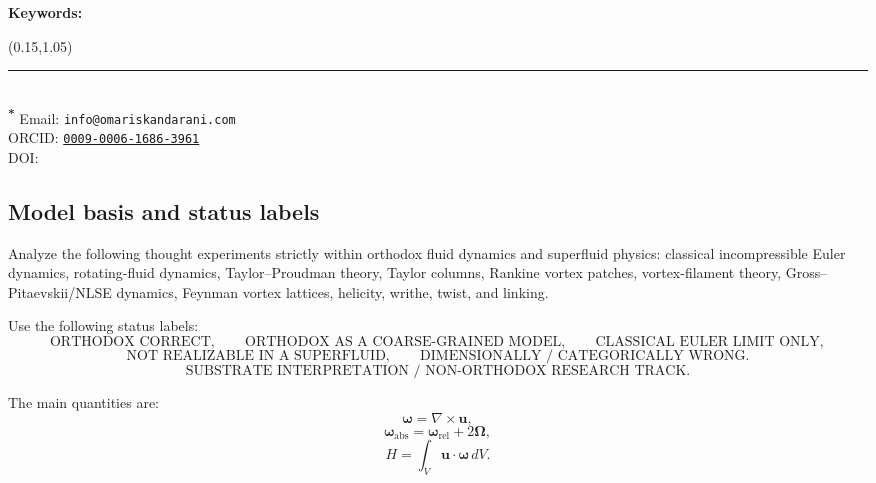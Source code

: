 \documentclass[11pt]{article}
\begin{document}
    \noindent\textbf{Keywords:} \paperkeywords


    \begin{textblock*}{1\textwidth}(0.15\textwidth,1.05\textheight)\raggedright\footnotesize\renewcommand{\arraystretch}{1.0} \noindent\rule{\textwidth}{0.4pt}\\[0.5em]
        \textsuperscript{\textbf{*}} Email: \texttt{info@omariskandarani.com}\\  
        ORCID: \texttt{\href{https://orcid.org/0009-0006-1686-3961}{0009-0006-1686-3961}}\\
        DOI: \href{https://doi.org/\paperdoi}{\paperdoi}    
    \end{textblock*}
    
    
    
    \newpage
    \tableofcontents
    \newpage

        \subsection{Model basis and status labels}
            
            Analyze the following thought experiments strictly within orthodox fluid dynamics and superfluid physics:
            classical incompressible Euler dynamics, rotating-fluid dynamics, Taylor--Proudman theory,
            Taylor columns, Rankine vortex patches, vortex-filament theory, Gross--Pitaevskii/NLSE dynamics,
            Feynman vortex lattices, helicity, writhe, twist, and linking.
            
            Use the following status labels:
            \[
                \text{ORTHODOX CORRECT},
                \qquad
                \text{ORTHODOX AS A COARSE-GRAINED MODEL},
                \qquad
                \text{CLASSICAL EULER LIMIT ONLY},
            \]
            \[
                \text{NOT REALIZABLE IN A SUPERFLUID},
                \qquad
                \text{DIMENSIONALLY / CATEGORICALLY WRONG}.
            \]
            \[
                \text{SUBSTRATE INTERPRETATION / NON-ORTHODOX RESEARCH TRACK}.
            \]
            
            The main quantities are:
            \[
                \boldsymbol{\omega}=\nabla\times\mathbf{u},
            \]
            \[
                \boldsymbol{\omega}_{\mathrm{abs}}
                =
                \boldsymbol{\omega}_{\mathrm{rel}}
                +
                2\boldsymbol{\Omega},
            \]
            \[
                H=\int_V \mathbf{u}\cdot\boldsymbol{\omega}\,dV.
            \]
            
\end{document}
